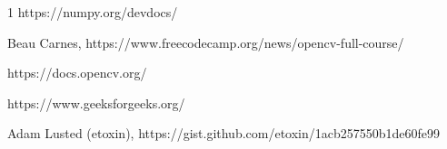 \documentclass[journal]{IEEEtran}
\begin{document}
\begin{thebibliography}{1}
https://numpy.org/devdocs/

Beau Carnes, https://www.freecodecamp.org/news/opencv-full-course/

https://docs.opencv.org/

https://www.geeksforgeeks.org/

Adam Lusted (etoxin), https://gist.github.com/etoxin/1acb257550b1de60fe99

\end{thebibliography}
\end{document}
